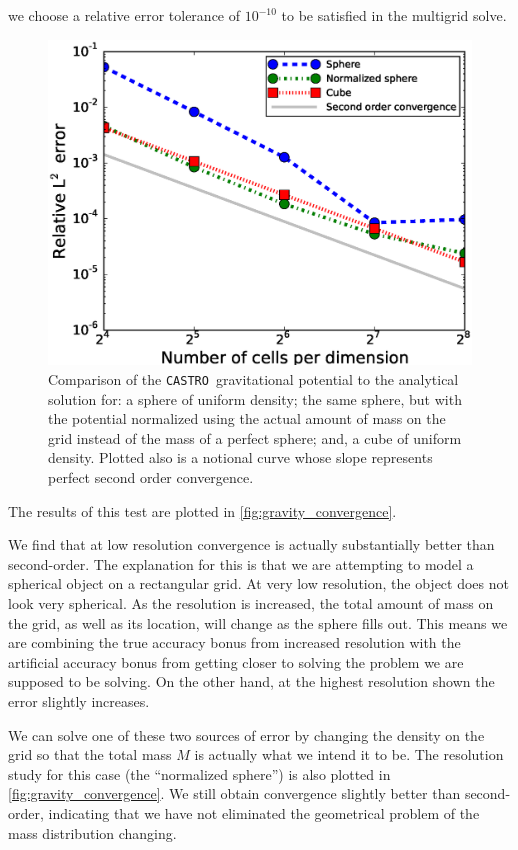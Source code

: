 \documentclass[iop]{../emulateapj}
\newcommand{\castro}{\texttt{CASTRO}}
\begin{document}
we choose a relative error tolerance of $10^{-10}$ to be satisfied in the multigrid solve.
\begin{figure}[h]
  \centering
  \includegraphics[scale=0.45]{plots/phi_comparison}
  \caption{Comparison of the \castro\ gravitational potential to the analytical solution for: 
    a sphere of uniform density; the same sphere, but with the potential normalized using the 
    actual amount of mass on the grid instead of the mass of a perfect sphere; and, a 
    cube of uniform density. Plotted also is a notional curve whose slope represents
    perfect second order convergence.\label{fig:gravity_convergence}}
\end{figure}
The results of this test are plotted in \autoref{fig:gravity_convergence}. 

We find that at low resolution 
convergence is actually substantially better than second-order. The 
explanation for this is that we are attempting to model a spherical 
object on a rectangular grid. At very low resolution, the object does 
not look very spherical. As the resolution is increased, the total 
amount of mass on the grid, as well as its location, will change 
as the sphere fills out. This means we are combining the true accuracy 
bonus from increased resolution with the artificial accuracy bonus 
from getting closer to solving the problem we are supposed to be solving. 
On the other hand, at the highest resolution shown the error slightly increases.

We can solve one of these two sources of error by changing the density on  
the grid so that the total mass $M$ is actually what we intend it to be.
The resolution study for this case (the ``normalized sphere'') is also
plotted in \autoref{fig:gravity_convergence}. We still obtain
convergence slightly better than second-order, indicating that we 
have not eliminated the geometrical problem of the mass distribution changing.
\end{document}
